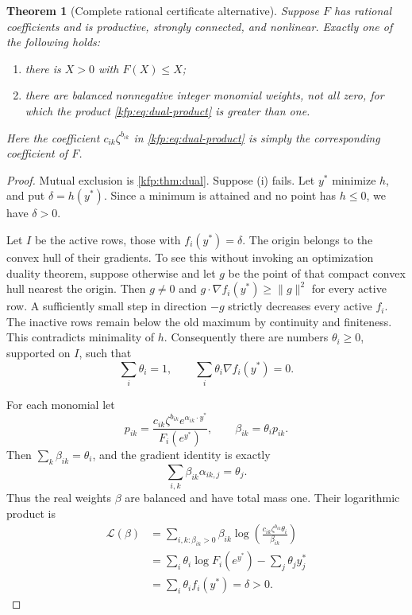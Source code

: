 \documentclass[11pt,a4paper]{article}
\newtheorem{theorem}{Theorem}[section]
\theoremstyle{definition}
\theoremstyle{remark}
\begin{document}
\begin{theorem}[Complete rational certificate alternative]\label{kfp:thm:alternative}
Suppose $F$ has rational coefficients and is productive, strongly connected,
and nonlinear. Exactly one of the following holds:
\begin{enumerate}[label=(\roman*)]
 \item there is $X>0$ with $F(X)\leq X$;
 \item there are balanced nonnegative integer monomial weights, not all zero,
       for which the product \eqref{kfp:eq:dual-product} is greater than one.
\end{enumerate}
Here the coefficient $c_{ik}\zeta^{b_{ik}}$ in
\eqref{kfp:eq:dual-product} is simply the corresponding coefficient of $F$.
\end{theorem}
\begin{proof}
Mutual exclusion is \cref{kfp:thm:dual}. Suppose (i) fails. Let $y^*$ minimize
$h$, and put $\delta=h(y^*)$. Since a minimum is attained and no point has
$h\leq0$, we have $\delta>0$.

Let $I$ be the active rows, those with $f_i(y^*)=\delta$.
The origin belongs to the convex hull of their gradients. To see this
without invoking an optimization duality theorem, suppose otherwise and let
$g$ be the point of that compact convex hull nearest the origin.
Then $g\ne0$ and
$g\cdot\nabla f_i(y^*)\geq\|g\|^2$ for every active row.
A sufficiently small step in direction $-g$ strictly decreases every active
$f_i$. The inactive rows remain below the old maximum by continuity and
finiteness. This contradicts minimality of $h$.
Consequently there are numbers $\theta_i\geq0$, supported on $I$, such that
\[
 \sum_i\theta_i=1,\qquad
 \sum_i\theta_i\nabla f_i(y^*)=0.
\]

For each monomial let
\[
 p_{ik}=
 \frac{c_{ik}\zeta^{b_{ik}}e^{\alpha_{ik}\cdot y^*}}
      {F_i(e^{y^*})},\qquad
 \beta_{ik}=\theta_i p_{ik}.
\]
Then $\sum_k\beta_{ik}=\theta_i$, and the gradient identity is exactly
\[
 \sum_{i,k}\beta_{ik}\alpha_{ik,j}=\theta_j.
\]
Thus the real weights $\beta$ are balanced and have total mass one.
Their logarithmic product is
\begin{align*}
 \mathcal L(\beta)
 &=\sum_{i,k:\beta_{ik}>0}
 \beta_{ik}\log\left(
   \frac{c_{ik}\zeta^{b_{ik}}\theta_i}{\beta_{ik}}\right)\\
 &=\sum_i\theta_i\log F_i(e^{y^*})
   -\sum_j\theta_j y_j^*\\
 &=\sum_i\theta_i f_i(y^*)=\delta>0.
\end{align*}


\end{proof}
\end{document}
